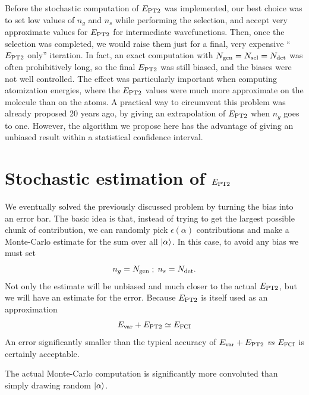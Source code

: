 \documentclass[./thesis.tex]{subfiles}
\begin{document}
Before the stochastic computation of $E_\text{PT2}$ was implemented, our best choice was to set low values of $n_g$ and $n_s$ while performing the selection, and accept very approximate values for $E_\text{PT2}$ for intermediate wavefunctions. Then, once the selection was completed, we would raise them just for a final, very expensive ``$E_\text{PT2}$ only'' iteration. In fact, an exact computation with ${N_\text{gen}}={N_\text{sel}}={N_\text{det}}$ was often prohibitively long, so the final $E_\text{PT2}$ was still biased, and the biases were not well controlled. The effect was particularly important when computing atomization energies, where the $E_\text{PT2}$ values were much more approximate on the molecule than on the atoms.
A practical way to circumvent this problem was already proposed 20 years ago, by giving an extrapolation of $E_\text{PT2}$ when $n_g$ goes to one.\cite{Angeli_1997} However, the algorithm we propose here has the advantage of giving an unbiased result within a statistical confidence interval.

\section{Stochastic estimation of $E_\text{PT2}$}

We eventually solved the previously discussed problem by turning the bias into an error bar. The basic idea is that, instead of trying to get the largest possible chunk of contribution, we can randomly pick $\epsilon(\alpha)$ contributions and make a Monte-Carlo estimate for the sum over all $\ket \alpha$. In this case, to avoid any bias we must set
\begin{equation}
n_g = {N_\text{gen}} \; ; \; n_s = {N_\text{det}}.
\end{equation}
Not only the estimate will be unbiased and much closer to the actual $E_\text{PT2}$, but we will have an estimate for the error. Because $E_\text{PT2}$ is itself used as an approximation
\begin{equation}
E_\text{var} + E_\text{PT2} \simeq E_\text{FCI}
\end{equation}
An error significantly smaller than the typical accuracy of $E_\text{var} + E_\text{PT2}$ \textit{vs} $E_\text{FCI}$ is certainly acceptable.

The actual Monte-Carlo computation is significantly more convoluted than simply drawing random ${\ket{\alpha}}$.
\end{document}
